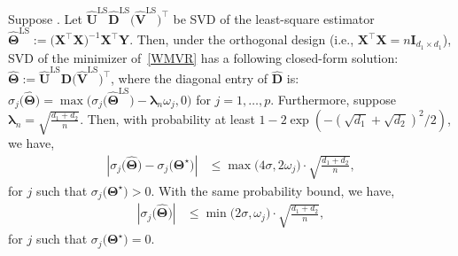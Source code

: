 \documentclass[alpha-refs]{wiley-article}
\begin{document}
\begin{proposition} \label{clsed-form}
    Suppose .
    Let $\widehat{\boldsymbol{U}}^{\text{LS}}\widehat{\boldsymbol{D}}^{\text{LS}}\big(\widehat{\boldsymbol{V}}^{\text{LS}}\big)^{\top}$ be SVD of the least-square estimator $\widehat{\boldsymbol{\Theta}}^{\text{LS}}:=\big(\boldsymbol{X}^{\top}\boldsymbol{X}\big)^{-1}\boldsymbol{X}^{\top}\boldsymbol{Y}$.
    Then, under the orthogonal design (i.e., $\boldsymbol{X}^{\top}\boldsymbol{X}=n\boldsymbol{I}_{d_{1} \times d_{1}}$), SVD of the minimizer of~\eqref{WMVR} has a following closed-form solution:
    $\widehat{\boldsymbol{\Theta}} := \widehat{\boldsymbol{U}}^{\text{LS}}\widehat{\boldsymbol{D}}\big(\widehat{\boldsymbol{V}}^{\text{LS}}\big)^{\top}$,
    where the diagonal entry of $\widehat{\boldsymbol{D}}$ is:
    $\sigma_{j}\big(\widehat{\boldsymbol{\Theta}}\big) = \max \big(  \sigma_{j}\big(\widehat{\boldsymbol{\Theta}}^{\text{LS}}\big)-\boldsymbol{\lambda}_{n} \omega_{j},0 \big)$ for $j=1,\dots,p$.
    Furthermore, suppose $\boldsymbol{\lambda}_{n}=\sqrt{\frac{d_{1}+d_{2}}{n}}$.
    Then, with probability at least $1-2\exp(-(\sqrt{d_{1}}+\sqrt{d_{2}})^{2}/2)$, we have,
    \begin{align} \label{sing1}
        \left| \sigma_{j}\big(\widehat{\boldsymbol{\Theta}}\big)-\sigma_{j}\big(\boldsymbol{\Theta}^{\star}\big)\right|
        &\leq \max\big(4\sigma,2\omega_{j}\big)\cdot \sqrt{\frac{d_{1}+d_{2}}{n}},
    \end{align}
    for $j$ such that $\sigma_{j}\big(\boldsymbol{\Theta}^{\star}\big)>0$.
    With the same probability bound, we have,
    \begin{align} \label{sing2}
        \left| \sigma_{j}\big(\widehat{\boldsymbol{\Theta}}\big)\right|
        &\leq \min\big(2\sigma,\omega_{j}\big)\cdot \sqrt{\frac{d_{1}+d_{2}}{n}},
    \end{align}
    for $j$ such that $\sigma_{j}\big(\boldsymbol{\Theta}^{\star}\big)=0$.
\end{proposition}
\end{document}
